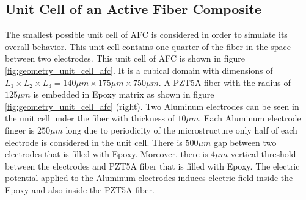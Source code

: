 \subsection{Unit Cell of an Active Fiber Composite}
The smallest possible unit cell of AFC is considered in order to simulate its overall behavior.
This unit cell contains one quarter of the fiber in the space between two electrodes.
This unit cell of AFC is shown in figure \ref{fig:geometry_unit_cell_afc}.
It is a cubical domain with dimensions of $L_1 \times L_2 \times L_3 =140 \mu m \times 175 \mu m \times 750 \mu m$.
A PZT5A fiber with the radius of $125 \mu m$ is embedded in Epoxy matrix as shown in figure \ref{fig:geometry_unit_cell_afc} (right).
Two Aluminum electrodes can be seen in the unit cell under the fiber with thickness of $10 \mu m$. 
Each Aluminum electrode finger is $250 \mu m$ long due to periodicity of the microstructure only half of each electrode is considered in the unit cell.
There is $500 \mu m$ gap between two electrodes that is filled with Epoxy.
Moreover, there is $4 \mu m$ vertical threshold between the electrodes and PZT5A fiber that is filled with Epoxy.
The electric potential applied to the Aluminum electrodes induces electric field inside the Epoxy and also inside the PZT5A fiber.

